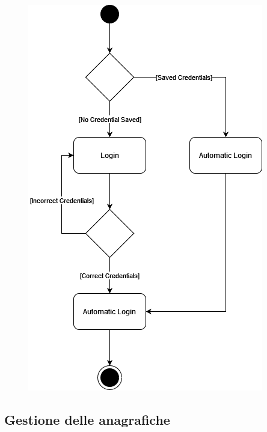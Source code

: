 \documentclass[a4paper, oneside, 12pt]{article}
\begin{document}
\begin{figure}[H]
	\centering
	\includegraphics[width = 10 cm]{images/logincredenziali.png}
	\label{fig:login credenziali}
\end{figure}

\newpage
\subsection{Gestione delle anagrafiche}
\end{document}
